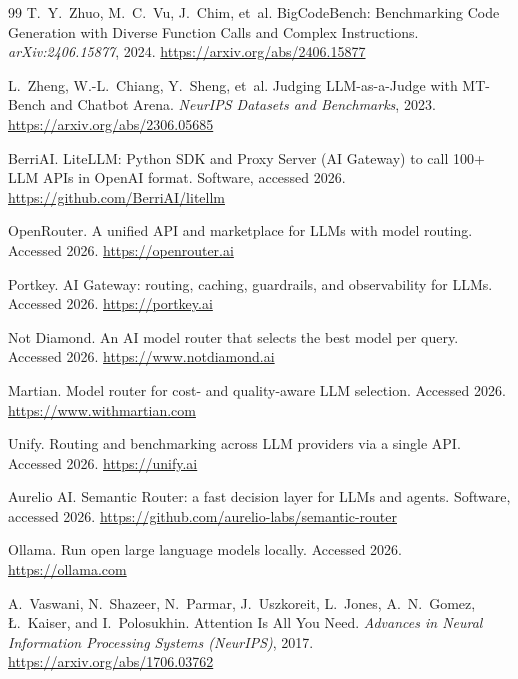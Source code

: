 \documentclass[11pt]{article}
\begin{document}
\begin{thebibliography}{99}
T.~Y.~Zhuo, M.~C.~Vu, J.~Chim, et~al.
\newblock BigCodeBench: Benchmarking Code Generation with Diverse Function Calls
and Complex Instructions.
\newblock \emph{arXiv:2406.15877}, 2024. \url{https://arxiv.org/abs/2406.15877}

L.~Zheng, W.-L.~Chiang, Y.~Sheng, et~al.
\newblock Judging LLM-as-a-Judge with MT-Bench and Chatbot Arena.
\newblock \emph{NeurIPS Datasets and Benchmarks}, 2023.
\url{https://arxiv.org/abs/2306.05685}

BerriAI.
\newblock LiteLLM: Python SDK and Proxy Server (AI Gateway) to call 100+ LLM
APIs in OpenAI format.
\newblock Software, accessed 2026. \url{https://github.com/BerriAI/litellm}

OpenRouter.
\newblock A unified API and marketplace for LLMs with model routing.
\newblock Accessed 2026. \url{https://openrouter.ai}

Portkey.
\newblock AI Gateway: routing, caching, guardrails, and observability for LLMs.
\newblock Accessed 2026. \url{https://portkey.ai}

Not Diamond.
\newblock An AI model router that selects the best model per query.
\newblock Accessed 2026. \url{https://www.notdiamond.ai}

Martian.
\newblock Model router for cost- and quality-aware LLM selection.
\newblock Accessed 2026. \url{https://www.withmartian.com}

Unify.
\newblock Routing and benchmarking across LLM providers via a single API.
\newblock Accessed 2026. \url{https://unify.ai}

Aurelio AI.
\newblock Semantic Router: a fast decision layer for LLMs and agents.
\newblock Software, accessed 2026.
\url{https://github.com/aurelio-labs/semantic-router}

Ollama.
\newblock Run open large language models locally.
\newblock Accessed 2026. \url{https://ollama.com}

A.~Vaswani, N.~Shazeer, N.~Parmar, J.~Uszkoreit, L.~Jones, A.~N.~Gomez,
{\L}.~Kaiser, and I.~Polosukhin.
\newblock Attention Is All You Need.
\newblock \emph{Advances in Neural Information Processing Systems (NeurIPS)},
2017. \url{https://arxiv.org/abs/1706.03762}

\end{thebibliography}
\end{document}
